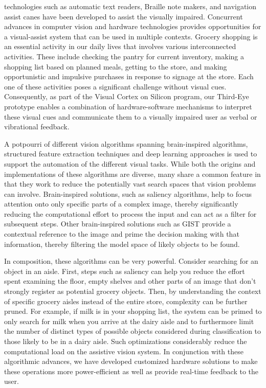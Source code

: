  technologies such as automatic text readers, 
Braille note makers, and navigation assist canes have been developed to assist the
visually impaired. 
Concurrent advances in computer vision and hardware
technologies provides opportunities for a visual-assist system that
can be used in multiple contexts.
Grocery shopping is an essential activity in our daily lives that involves various
interconnected activities. These include checking the pantry for
current inventory, making a shopping list based on planned meals,
getting to the store, and making opportunistic and impulsive purchases
in response to signage at the store. Each one of these activities
poses a significant challenge without visual cues. Consequently, as part of 
the Visual Cortex on Silicon program, our
Third-Eye prototype enables a combination of hardware-software
mechanisms to interpret these visual cues and communicate them to a
visually impaired user as verbal or vibrational feedback.

A potpourri of different vision algorithms spanning brain-inspired
algorithms, structured feature extraction techniques and deep learning
approaches is used to support the automation of the different visual
tasks. While both the origins and implementations of these algorithms
are diverse, many share a common feature in that they work to reduce
the potentially vast search spaces that vision problems can
involve. Brain-inspired solutions, such as saliency algorithms, help
to focus attention onto only specific parts of a complex image,
thereby significantly reducing the computational effort to process the
input and can act as a filter for subsequent steps.  Other
brain-inspired solutions such as GIST provide a contextual reference
to the image and prime the decision making with that information,
thereby filtering the model space of likely objects to be found.

In composition, these algorithms can be very powerful. Consider
searching for an object in an aisle. First, steps such as saliency can
help you reduce the effort spent examining the floor, empty shelves
and other parts of an image that don't strongly register as potential
grocery objects. Then, by understanding the context of specific
grocery aisles instead of the entire store, complexity can be further
pruned.  For example, if milk is in your shopping list, the system can
be primed to only search for milk when you arrive at the dairy aisle
and to furthermore limit the number of distinct types of possible
objects considered during classification to those likely to be in a
dairy aisle. Such optimizations considerably reduce the computational
load on the assistive vision system. In conjunction with these
algorithmic advances, we have developed customized hardware solutions
to make these operations more power-efficient as well as provide
real-time feedback to the user.

